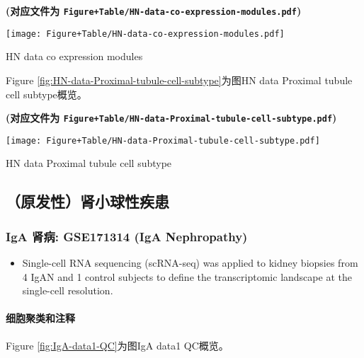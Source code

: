 \documentclass[
]{article}
\providecommand{\tightlist}{%
  \setlength{\itemsep}{0pt}\setlength{\parskip}{0pt}}
\begin{document}
\textbf{(对应文件为 \texttt{Figure+Table/HN-data-co-expression-modules.pdf})}

\def\@captype{figure}
\begin{center}
\texttt{[image: Figure+Table/HN-data-co-expression-modules.pdf]}
\caption{HN data co expression modules}\label{fig:HN-data-co-expression-modules}
\end{center}

Figure \ref{fig:HN-data-Proximal-tubule-cell-subtype}为图HN data Proximal tubule cell subtype概览。

\textbf{(对应文件为 \texttt{Figure+Table/HN-data-Proximal-tubule-cell-subtype.pdf})}

\def\@captype{figure}
\begin{center}
\texttt{[image: Figure+Table/HN-data-Proximal-tubule-cell-subtype.pdf]}
\caption{HN data Proximal tubule cell subtype}\label{fig:HN-data-Proximal-tubule-cell-subtype}
\end{center}

\hypertarget{ux539fux53d1ux6027ux80beux5c0fux7403ux6027ux75beux60a3}{%
\subsection{（原发性）肾小球性疾患}\label{ux539fux53d1ux6027ux80beux5c0fux7403ux6027ux75beux60a3}}

\hypertarget{iga-ux80beux75c5-gse171314-iga-nephropathy}{%
\subsubsection{IgA 肾病: GSE171314 (IgA Nephropathy)}\label{iga-ux80beux75c5-gse171314-iga-nephropathy}}

\begin{itemize}
\tightlist
\item
  Single-cell RNA sequencing (scRNA-seq) was applied to kidney biopsies from 4
  IgAN and 1 control subjects to define the transcriptomic landscape at the
  single-cell resolution.
\end{itemize}

\hypertarget{ux7ec6ux80deux805aux7c7bux548cux6ce8ux91ca-2}{%
\paragraph{细胞聚类和注释}\label{ux7ec6ux80deux805aux7c7bux548cux6ce8ux91ca-2}}

Figure \ref{fig:IgA-data1-QC}为图IgA data1 QC概览。
\end{document}
